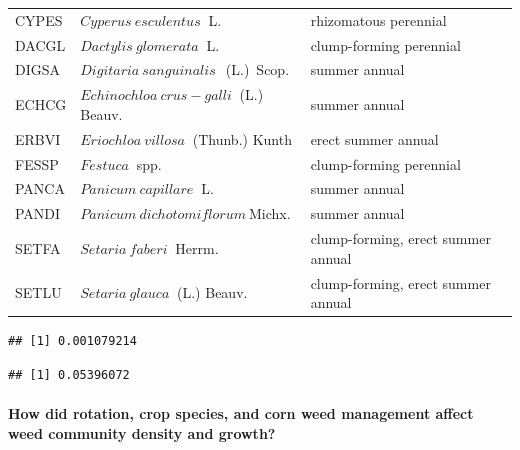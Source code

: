 \documentclass[
]{article}
\begin{document}
\begin{table}
\begin{tabular}[t]{l|l|l}
\hspace{1em}CYPES & $Cyperus~esculentus$$~$ L. & rhizomatous perennial\\
 
\hspace{1em}DACGL & $Dactylis~glomerata$$~$ L. & clump-forming perennial\\
 
\hspace{1em}DIGSA & $Digitaria~sanguinalis$$~$~(L.)~Scop. & summer annual\\
 
\hspace{1em}ECHCG & $Echinochloa~crus-galli$$~$ (L.) Beauv. & summer annual\\
 
\hspace{1em}ERBVI & $Eriochloa~villosa$$~$ (Thunb.) Kunth & erect summer annual\\
 
\hspace{1em}FESSP & $Festuca$$~$ spp. & clump-forming perennial\\
 
\hspace{1em}PANCA & $Panicum~capillare$$~$ L. & summer annual\\
 
\hspace{1em}PANDI & $Panicum~dichotomiflorum$$~$Michx. & summer annual\\
 
\hspace{1em}SETFA & $Setaria~faberi$$~$ Herrm. & clump-forming, erect summer annual\\
 
\hspace{1em}SETLU & $Setaria~glauca$$~$ (L.) Beauv. & clump-forming, erect summer annual\\
\hline
\end{tabular}
\end{table}

\begin{verbatim}
## [1] 0.001079214
\end{verbatim}

\begin{verbatim}
## [1] 0.05396072
\end{verbatim}

\paragraph*{How did rotation, crop species, and corn weed management affect weed community density and growth?}\label{how-did-rotation-crop-species-and-corn-weed-management-affect-weed-community-density-and-growth}
\end{document}
